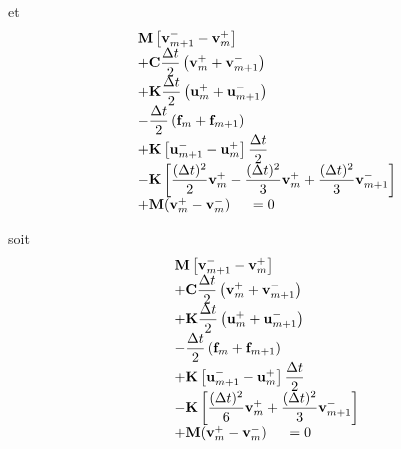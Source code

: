 \documentclass[12pt,a4paper]{report}
\begin{document}
et 
\begin{equation}
\begin{array}{r l}
	&\displaystyle
	 \mathbf{M}
	    	\left[ \mathbf{v}_{m+1}^- 
	    		- \mathbf{v}_m^+ \right]
	\\ 
	  &\displaystyle
	  +\mathbf{C} \frac{\Delta t}{2}
		\left(
			\mathbf{v}_m^+ + 
			\mathbf{v}_{m+1}^- 
		\right)
	\\
	  &\displaystyle
	 +\mathbf{K} \frac{\Delta t}{2}
		\left(
			\mathbf{u}_m^+ + 
			\mathbf{u}_{m+1}^- 
		\right)
	\\
	  &\displaystyle
	   -\frac{\Delta t}{2}
		\left(
			\mathbf{f}_m + 
			\mathbf{f}_{m+1}
		\right)
	\\
	  &+\displaystyle
	    \mathbf{K}
	    	\left[ \mathbf{u}_{m+1}^- 
	    		- \mathbf{u}_m^+ \right]		
			\frac{\Delta t}{2}
	\\
	  &\displaystyle	    
	    -\mathbf{K}
		\left[
			\frac{(\Delta t)^2}{2} \mathbf{v}_m^+  
			-\frac{(\Delta t)^2}{3} \mathbf{v}_m^+  
			+\frac{(\Delta t)^2}{3} \mathbf{v}_{m+1}^- 
		\right]
	\\
	  &+  \mathbf{M}(\mathbf{v}_m^+ - \mathbf{v}_m^-)
	~~~~=0	
\end{array}
\end{equation} 

soit
\begin{equation}
\begin{array}{r l}
	&\displaystyle
	 \mathbf{M}
	    	\left[ \mathbf{v}_{m+1}^- 
	    		- \mathbf{v}_m^+ \right]
	\\ 
	  &\displaystyle
	  +\mathbf{C} \frac{\Delta t}{2}
		\left(
			\mathbf{v}_m^+ + 
			\mathbf{v}_{m+1}^- 
		\right)
	\\
	  &\displaystyle
	 +\mathbf{K} \frac{\Delta t}{2}
		\left(
			\mathbf{u}_m^+ + 
			\mathbf{u}_{m+1}^- 
		\right)
	\\
	  &\displaystyle
	   -\frac{\Delta t}{2}
		\left(
			\mathbf{f}_m + 
			\mathbf{f}_{m+1}
		\right)
	\\
	  &+\displaystyle
	    \mathbf{K}
	    	\left[ \mathbf{u}_{m+1}^- 
	    		- \mathbf{u}_m^+ \right]		
			\frac{\Delta t}{2}
	\\
	  &\displaystyle	    
	    -\mathbf{K}
		\left[
			\frac{(\Delta t)^2}{6} \mathbf{v}_m^+  
			+\frac{(\Delta t)^2}{3} \mathbf{v}_{m+1}^- 
		\right]
	\\
	  &+  \mathbf{M}(\mathbf{v}_m^+ - \mathbf{v}_m^-)
	~~~~=0	
\end{array}
\end{equation}
\end{document}

